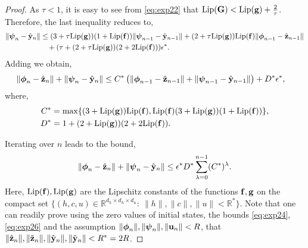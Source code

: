 \documentclass{article} \usepackage{iclr2022_conference,times}
\newcommand{\by}{{\bf y}}
\newcommand{\bz}{{\bf z}}
\newcommand{\bu}{{\bf u}}
\newcommand{\bc}{{\boldsymbol{\psi}}}
\newcommand{\bh}{{\boldsymbol{\phi}}}
\newcommand{\R}{{\mathbb R}}
\newcommand{\bG}{{\bf G}}
\newcommand{\bif}{{\bf f}}
\newcommand{\bg}{{\bf g}}
\begin{document}
\begin{proof}
As $\tau < 1$, it is easy to see from \eqref{eq:exp22} that ${\rm Lip}(\bG) < {\rm Lip}(\bg)+\frac{2}{\tau}$. Therefore, the last inequality reduces to,
\begin{align*}
     \|\bc_n - \hat{\by}_n\| &\leq (3+\tau{\rm Lip}(\bg))(1+{\rm Lip}(\bif))\|\bc_{n-1} - \hat{\by}_{n-1}\| + (2+\tau{\rm Lip}(\bg)){\rm Lip}(\bif)\|\bh_{n-1}-\hat{\bz}_{n-1}\|\\&\hspace{0.325cm}+ \left(\tau + (2+\tau{\rm Lip}(\bg))(2+2{\rm Lip}(\bif)\right))\epsilon^{\ast}.
\end{align*}
Adding we obtain,
\begin{equation}
    \label{eq:exp27}
    \begin{aligned}
   \|\bh_n - \hat{\bz}_n\| + \|\bc_{n} - \hat{\by}_{n}\| &\leq C^{\ast}\left(\|\bh_{n-1} - \hat{\bz}_{n-1}\| + \|\bc_{n-1} - \hat{\by}_{n-1}\|\right) + D^{\ast} \epsilon^{\ast},  
   \end{aligned}
\end{equation}
where,
\begin{equation}
    \label{eq:exp28}
    \begin{aligned}
    C^{\ast} &= \max\limits\{(3+{\rm Lip}(\bg)){\rm Lip}(\bif), {\rm Lip}(\bif)(3+{\rm Lip}(\bg))(1+{\rm Lip}(\bif))\}, \\
    D^{\ast} &= 1 + (2 +{\rm Lip}(\bg))(2+2{\rm Lip}(\bif)).
    \end{aligned}
\end{equation}

Iterating over $n$ leads to the bound,
\begin{equation}
    \label{eq:exp29}
     \|\bh_n - \hat{\bz}_n\| + \|\bc_{n} - \hat{\by}_{n}\| \leq \epsilon^{\ast}D^{\ast}\sum_{\lambda=0}^{n-1}(C^{\ast})^{\lambda}.
\end{equation}
Here, ${\rm Lip}(\bif),{\rm Lip}(\bg)$ are the Lipschitz constants of the functions $\bif,\bg$ on the compact set $\{(h,c,u) \in \R^{d_h\times d_h\times d_u}: ~\|h\|,\|c\|,\|u\| < \R^{\ast}\}$. Note that one can readily prove using the zero values of initial states, the bounds \eqref{eq:exp24}, \eqref{eq:exp26} and the assumption $\|\bh_n\|,\|\bc_n\|,\|\bu_n\| < R$, that $\|\hat{\bz}_n\|,\|\tilde{\bz}_n\|,\|\hat{\by}_n\|,\|\tilde{\by}_n\| < R^{\ast} = 2R$. 


\end{proof}
\end{document}
